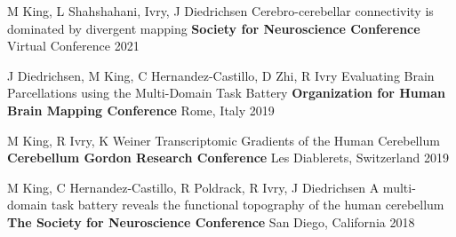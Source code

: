 

\begin{cventries}

  \cventry
    {M King, L Shahshahani, Ivry, J Diedrichsen} %
    {Cerebro-cerebellar connectivity is dominated by divergent mapping} %
    {\textbf{Society for Neuroscience Conference}} %
    {Virtual Conference} %
    {2021} %


  \cventry
    {J Diedrichsen, M King, C Hernandez-Castillo, D Zhi, R Ivry} %
    {Evaluating Brain Parcellations using the Multi-Domain Task Battery} %
    {\textbf{Organization for Human Brain Mapping Conference}} %
    {Rome, Italy} %
    {2019} %
    
    
  \cventry
    {M King, R Ivry, K Weiner} %
    {Transcriptomic Gradients of the Human Cerebellum} %
    {\textbf{Cerebellum Gordon Research Conference}} %
    {Les Diablerets, Switzerland} %
    {2019} %
    
  \cventry
    {M King, C Hernandez-Castillo, R Poldrack, R Ivry, J Diedrichsen} %
    {A multi-domain task battery reveals the functional topography of the human cerebellum} %
    {\textbf{The Society for Neuroscience Conference}} %
    {San Diego, California} %
    {2018} %


\end{cventries}

